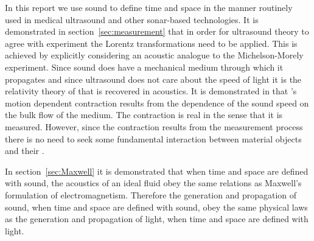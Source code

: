





In this report we use sound to define time and space 
in the manner  routinely used in medical ultrasound and other sonar-based technologies.
It is demonstrated in section~\ref{sec:measurement} that in order for ultrasound theory 
to agree with experiment the Lorentz transformations need to be applied.
This is achieved by explicitly considering an acoustic analogue to the Michelson-Morely experiment.
Since sound  does have a mechanical medium through which it propagates and since ultrasound does not care about the speed of light
it is the relativity theory of \Poincare that is recovered in acoustics.
It is demonstrated in   that \Poincare's motion dependent contraction 
results from the dependence of the  sound speed on the bulk flow of the medium.
The contraction is real in the sense that it is measured.
However, since the contraction results from the measurement process there is 
no need to seek some fundamental interaction between material objects and their \aether.

In section~\ref{sec:Maxwell} it is demonstrated that  when time and space are defined with sound, 
the acoustics of an ideal fluid obey the same relations as Maxwell's formulation of electromagnetism.
Therefore the generation and propagation of sound,  when time and space are defined with  sound,
obey the same physical laws as the generation and propagation of light,  when time and space are defined with light.


